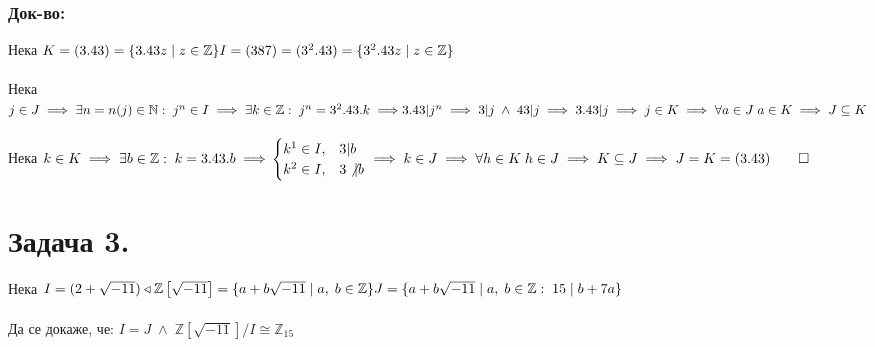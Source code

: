 \documentclass[12pt]{article}
\newcommand{\Z}{\mathbb{Z}}
\newcommand{\N}{\mathbb{N}}
\begin{document}
    \subsubsection*{Док-во:}
    Нека \(K = (3.43) = \{3.43z \; | \; z \in \Z\} \\\\
    I = (387) = (3^2.43) = \{3^2.43z \; | \; z \in \Z\} \) \\\\
    Нека \(j \in J \implies \exists n = n(j) \in \N : \; j^n \in I \implies \exists k \in \Z : \; j^n = 3^2.43.k \implies \\\\
    3.43 | j^n \implies 3 | j \; \wedge \; 43 | j \implies 3.43 | j \implies j \in K \implies \forall a \in J \; a \in K \implies J \subseteq K\) \\\\
    Нека \(k \in K \implies \exists b \in \Z : \; k = 3.43.b \implies \\\\
    \begin{cases}
    k^1 \in I, & 3|b \\
    k^2 \in I, & 3\not|b
    \end{cases} \implies k \in J \implies \forall h \in K \; h \in J \implies K \subseteq J \implies J = K = (3.43) \qed \)
    \section*{Задача 3.}
    Нека \(I = (2 + \sqrt{-11}) \triangleleft \Z\left[\sqrt{-11}\right] = \{a + b\sqrt{-11} \; | \; a, \; b \in \Z \} \\\\
    J = \{a + b\sqrt{-11} \; | \; a, \; b \in \Z : \; 15 \; | \; b + 7a \} \)  \\\\
    Да се докаже, че: \(I = J \; \wedge \; \Z\left[\sqrt{-11}\right]/I \cong \Z_{15} \)
\end{document}
